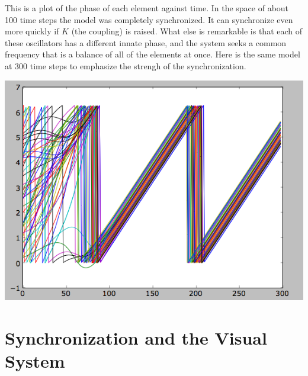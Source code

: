 \documentclass[12pt]{article}
\begin{document}
This is a plot of the phase of each element against time.  In the space of about 100 time steps the model was completely synchronized.  It can synchronize even more quickly if $K$ (the coupling) is raised.  What else is remarkable is that each of these oscillators has a different innate phase, and the system seeks a common frequency that is a balance of all of the elements at once.  Here is the same model at 300 time steps to emphasize the strengh of the synchronization.

\includegraphics[scale=0.67]{synchronization.png}

\section{Synchronization and the Visual System}
\end{document}
